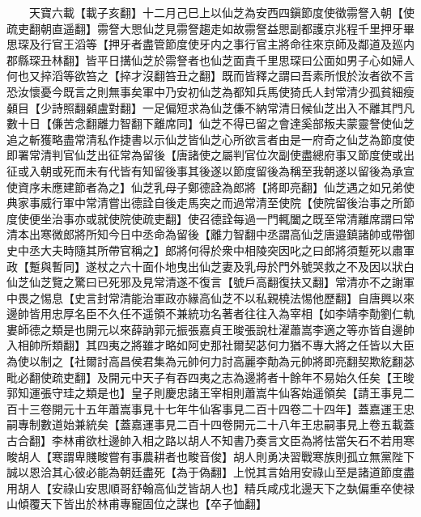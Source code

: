 　　天寶六載【載子亥翻】十二月己巳上以仙芝為安西四鎭節度使徵霛詧入朝【使疏吏翻朝直遥翻】霛詧大愳仙芝見霛詧趨走如故霛詧益愳副都護京兆程千里押牙畢思琛及行官王滔等【押牙者盡管節度使牙内之事行官主將命往來京師及鄰道及廵内郡縣琛丑林翻】皆平日搆仙芝於霛詧者也仙芝面責千里思琛曰公面如男子心如婦人何也又捽滔等欲笞之【捽才沒翻笞丑之翻】既而皆釋之謂曰吾素所恨於汝者欲不言恐汝懷憂今既言之則無事矣軍中乃安初仙芝為都知兵馬使猗氏人封常清少孤貧細瘦顙目【少詩照翻顙盧對翻】一足偏短求為仙芝傔不納常清日候仙芝出入不離其門凡數十日【傔苦念翻離力智翻下離席同】仙芝不得已留之會達奚部叛夫蒙靈詧使仙芝追之斬獲略盡常清私作捷書以示仙芝皆仙芝心所欲言者由是一府奇之仙芝為節度使即署常清判官仙芝出征常為留後【唐諸使之屬判官位次副使盡總府事又節度使或出征或入朝或死而未有代皆有知留後事其後遂以節度留後為稱至我朝遂以留後為承宣使資序未應建節者為之】仙芝乳母子鄭德詮為郎將【將即亮翻】仙芝遇之如兄弟使典家事威行軍中常清嘗出德詮自後走馬突之而過常清至使院【使院留後治事之所節度使便坐治事亦或就使院使疏吏翻】使召德詮每過一門輒闔之既至常清離席謂曰常清本出寒微郎將所知今日中丞命為留後【離力智翻中丞謂高仙芝唐邉鎮諸帥或帶御史中丞大夫時隨其所帶官稱之】郎將何得於衆中相陵突因叱之曰郎將須蹔死以肅軍政【蹔與暫同】遂杖之六十面仆地曳出仙芝妻及乳母於門外號哭救之不及因以狀白仙芝仙芝覽之驚曰已死邪及見常清遂不復言【號戶高翻復扶又翻】常清亦不之謝軍中畏之惕息【史言封常清能治軍政亦緣高仙芝不以私親橈法惕他歷翻】自唐興以來邊帥皆用忠厚名臣不久任不遥領不兼統功名著者往往入為宰相【如李靖李勣劉仁軌婁師德之類是也開元以來薛訥郭元振張嘉貞王晙張說杜濯蕭嵩李適之等亦皆自邊帥入相帥所類翻】其四夷之將雖才略如阿史那社爾契苾何力猶不專大將之任皆以大臣為使以制之【社爾討高昌侯君集為元帥何力討高麗李勣為元帥將即亮翻契欺紇翻苾毗必翻使疏吏翻】及開元中天子有吞四夷之志為邊將者十餘年不易始久任矣【王晙郭知運張守珪之類是也】皇子則慶忠諸王宰相則蕭嵩牛仙客始遥領矣【請王事見二百十三卷開元十五年蕭嵩事見十七年牛仙客事見二百十四卷二十四年】蓋嘉運王忠嗣專制數道始兼統矣【蓋嘉運事見二百十四卷開元二十八年王忠嗣事見上卷五載蓋古合翻】李林甫欲杜邊帥入相之路以胡人不知書乃奏言文臣為將怯當矢石不若用寒畯胡人【寒謂卑賤畯嘗有事農耕者也畯音俊】胡人則勇决習戰寒族則孤立無黨陛下誠以恩洽其心彼必能為朝廷盡死【為于偽翻】上悦其言始用安祿山至是諸道節度盡用胡人【安祿山安思順哥舒翰高仙芝皆胡人也】精兵咸戍北邊天下之埶偏重卒使禄山傾覆天下皆出於林甫專寵固位之謀也【卒子恤翻】

